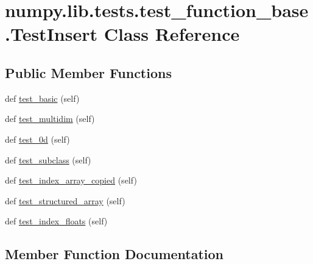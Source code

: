 \hypertarget{classnumpy_1_1lib_1_1tests_1_1test__function__base_1_1TestInsert}{}\section{numpy.\+lib.\+tests.\+test\+\_\+function\+\_\+base.\+Test\+Insert Class Reference}
\label{classnumpy_1_1lib_1_1tests_1_1test__function__base_1_1TestInsert}
\subsection*{Public Member Functions}
\begin{DoxyCompactItemize}
\item 
def \hyperlink{classnumpy_1_1lib_1_1tests_1_1test__function__base_1_1TestInsert_ad75feb8fe5a96368c55c666de30d62ac}{test\+\_\+basic} (self)
\item 
def \hyperlink{classnumpy_1_1lib_1_1tests_1_1test__function__base_1_1TestInsert_aa6cbe98520f449871ca43290b28e9010}{test\+\_\+multidim} (self)
\item 
def \hyperlink{classnumpy_1_1lib_1_1tests_1_1test__function__base_1_1TestInsert_ae22ee26940f2d2c404c89db49fbf8417}{test\+\_\+0d} (self)
\item 
def \hyperlink{classnumpy_1_1lib_1_1tests_1_1test__function__base_1_1TestInsert_a5bf3df8030480fa30cf6f6c8f0cbb2c3}{test\+\_\+subclass} (self)
\item 
def \hyperlink{classnumpy_1_1lib_1_1tests_1_1test__function__base_1_1TestInsert_a1f1451aa62e61595b95c8fd23d6f9277}{test\+\_\+index\+\_\+array\+\_\+copied} (self)
\item 
def \hyperlink{classnumpy_1_1lib_1_1tests_1_1test__function__base_1_1TestInsert_a5296f97ffd7f34b07623ead2fbdf5b0b}{test\+\_\+structured\+\_\+array} (self)
\item 
def \hyperlink{classnumpy_1_1lib_1_1tests_1_1test__function__base_1_1TestInsert_ae0bad17ba2597443e4d05a262b313cce}{test\+\_\+index\+\_\+floats} (self)
\end{DoxyCompactItemize}


\subsection{Member Function Documentation}
\mbox{\label{classnumpy_1_1lib_1_1tests_1_1test__function__base_1_1TestInsert_ae22ee26940f2d2c404c89db49fbf8417}} 
